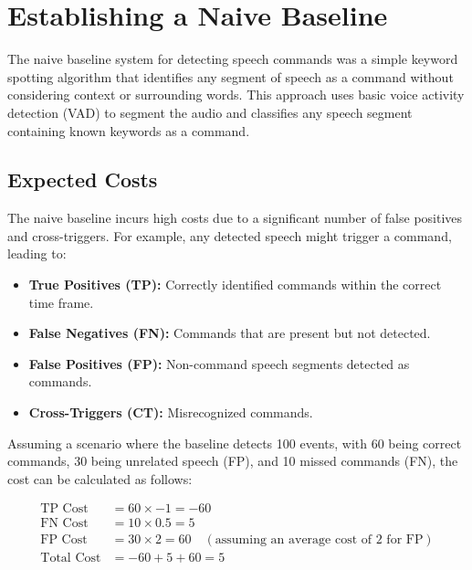 \section{Establishing a Naive Baseline}
The naive baseline system for detecting speech commands was a simple keyword spotting algorithm
that identifies any segment of speech as a command without considering context or surrounding words.
This approach uses basic voice activity detection (VAD) to segment the audio and classifies any speech segment containing known keywords as a command.

\subsection{Expected Costs}
The naive baseline incurs high costs due to a significant number of false positives and cross-triggers.
For example, any detected speech might trigger a command, leading to:

\begin{itemize}
  \item \textbf{True Positives (TP):} Correctly identified commands within the correct time frame.
  \item \textbf{False Negatives (FN):} Commands that are present but not detected.
  \item \textbf{False Positives (FP):} Non-command speech segments detected as commands.
  \item \textbf{Cross-Triggers (CT):} Misrecognized commands.
\end{itemize}

Assuming a scenario where the baseline detects 100 events, with 60 being correct commands, 30 being unrelated speech (FP), and 10 missed commands (FN),
the cost can be calculated as follows:

\begin{align*}
\text{TP Cost} &= 60 \times -1 = -60 \\
\text{FN Cost} &= 10 \times 0.5 = 5 \\
\text{FP Cost} &= 30 \times 2 = 60 \quad (\text{assuming an average cost of 2 for FP}) \\
\text{Total Cost} &= -60 + 5 + 60 = 5
\end{align*}
